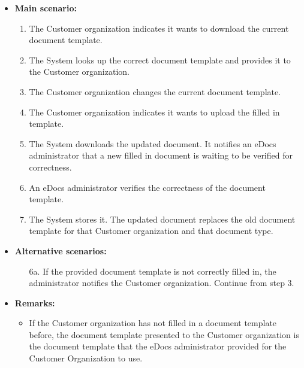 \documentclass[a4paper,10pt]{article}
\begin{document}
\begin{itemize}
    \item \textbf{Main scenario:} 
    \begin{enumerate}
       \item The Customer organization indicates it wants to download the current document template.
       \item The System looks up the correct document template and provides it to the Customer organization.
       \item The Customer organization changes the current document template.
       \item The Customer organization indicates it wants to upload the filled in template.
       \item The System downloads the updated document. It notifies an eDocs administrator that a new filled in document is waiting to be verified for correctness.
       \item An eDocs administrator verifies the correctness of the document template.
       \item The System stores it. The updated document replaces the old document template for that Customer organization and that document type.
    \end{enumerate}

    \item \textbf{Alternative scenarios:} 
    \begin{enumerate}
        \item [6a.] If the provided document template is not correctly filled in, the administrator notifies the Customer organization. Continue from step 3.
    \end{enumerate}
    
    \item \textbf{Remarks:}
        \begin{itemize}
            \item If the Customer organization has not filled in a document template before, the document template presented to the Customer organization is the document template that the eDocs administrator provided for the Customer Organization to use.
        \end{itemize}
\end{itemize}
\end{document}
